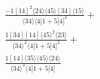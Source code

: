 \documentclass[varwidth, border=5pt]{standalone}
\begin{document}
\begin{my}
$\begin{gathered}
\scriptscriptstyle\frac{-1[14]^2⟨24⟩⟨45⟩[34]⟨15⟩}{⟨34⟩⟨4|1+5|4]^3}+\\
\scriptscriptstyle\frac{1[34][14]⟨45⟩^2⟨23⟩}{⟨34⟩^2⟨4|1+5|4]^2}+\\
\scriptscriptstyle\frac{1[14]⟨35⟩⟨45⟩⟨24⟩}{⟨34⟩^3⟨4|1+5|4]}\phantom{+}
\end{gathered}$
\end{my}
\end{document}
